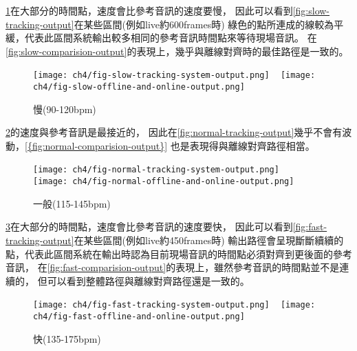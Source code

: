 \documentclass[class=NCU_thesis, crop=false]{standalone}
\begin{document}
\cref{fig:fig-ch4-slow-tracking-results}在大部分的時間點，速度會比參考音訊的速度要慢，
因此可以看到\cref{fig:slow-tracking-output}在某些區間(例如live約600frames時)
綠色的點所連成的線較為平緩，代表此區間系統輸出較多相同的參考音訊時間點來等待現場音訊。
在\cref{fig:slow-comparision-output}的表現上，幾乎與離線對齊時的最佳路徑是一致的。

\begin{figure}[H]
    \centering
    \subcaptionbox
    {
    \label{fig:slow-tracking-output}}
    {\texttt{[image: ch4/fig-slow-tracking-system-output.png]}}
    ~
    \subcaptionbox
    {
    \label{fig:slow-comparision-output}}
    {\texttt{[image: ch4/fig-slow-offline-and-online-output.png]}}
    \caption{慢(90-120bpm)}
    \label{fig:fig-ch4-slow-tracking-results}
\end{figure}

\cref{fig:fig-ch4-normal-tracking-results}的速度與參考音訊是最接近的，
因此在\cref{fig:normal-tracking-output}幾乎不會有波動，\cref{{fig:normal-comparision-output}}
也是表現得與離線對齊路徑相當。

\begin{figure}[H]
    \centering
    \subcaptionbox
    {
    \label{fig:normal-tracking-output}}
    {\texttt{[image: ch4/fig-normal-tracking-system-output.png]}}
    ~
    \subcaptionbox
    {
    \label{fig:normal-comparision-output}}
    {\texttt{[image: ch4/fig-normal-offline-and-online-output.png]}}
    \caption{一般(115-145bpm)}
    \label{fig:fig-ch4-normal-tracking-results}
\end{figure}

\cref{fig:fig-ch4-fast-tracking-results}在大部分的時間點，速度會比參考音訊的速度要快，
因此可以看到\cref{fig:fast-tracking-output}在某些區間(例如live約450frames時)
輸出路徑會呈現斷斷續續的點，代表此區間系統在輸出時認為目前現場音訊的時間點必須對齊到更後面的參考音訊，
在\cref{fig:fast-comparision-output}的表現上，雖然參考音訊的時間點並不是連續的，
但可以看到整體路徑與離線對齊路徑還是一致的。

\begin{figure}[H]
    \centering
    \subcaptionbox
    {
    \label{fig:fast-tracking-output}}
    {\texttt{[image: ch4/fig-fast-tracking-system-output.png]}}
    ~
    \subcaptionbox
    {
    \label{fig:fast-comparision-output}}
    {\texttt{[image: ch4/fig-fast-offline-and-online-output.png]}}
    \caption{快(135-175bpm)}
    \label{fig:fig-ch4-fast-tracking-results}
\end{figure}
\end{document}
